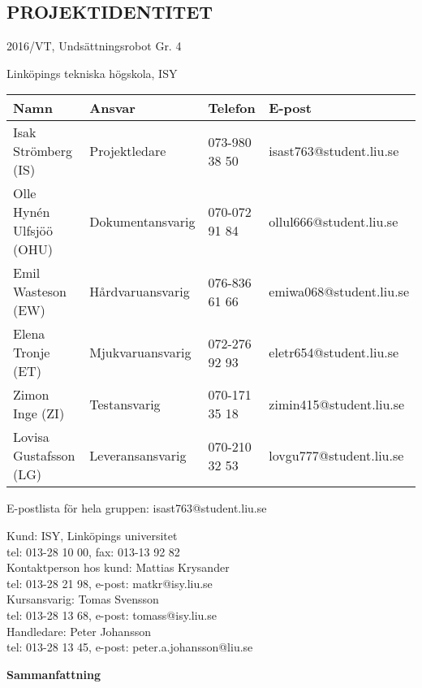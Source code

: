 \documentclass[11pt]{article}
\begin{document}
\pagebreak
\begin{center}

\section*{PROJEKTIDENTITET}
2016/VT, Undsättningsrobot Gr. 4

Linköpings tekniska högskola, ISY
\vspace{5em}
\begin{center}

\begin{tabular}{|l|l|l|l|} \hline
\textbf{Namn} & \textbf{Ansvar} & \textbf{Telefon} & \textbf{E-post}  \\ \hline 
Isak Strömberg (IS) & Projektledare & 073-980 38 50 & isast763@student.liu.se \\ \hline
Olle Hynén Ulfsjöö (OHU)& Dokumentansvarig & 070-072 91 84 & ollul666@student.liu.se \\ \hline
Emil Wasteson (EW) & Hårdvaruansvarig & 076-836 61 66 & emiwa068@student.liu.se \\ \hline
Elena Tronje (ET) & Mjukvaruansvarig & 072-276 92 93 & eletr654@student.liu.se \\ \hline
Zimon Inge (ZI)& Testansvarig & 070-171 35 18 & zimin415@student.liu.se \\ \hline
Lovisa Gustafsson (LG) & Leveransansvarig & 070-210 32 53 & lovgu777@student.liu.se \\ \hline
\end{tabular}

\end{center}

E-postlista för hela gruppen: isast763@student.liu.se

\vspace{5em}
Kund: ISY, Linköpings universitet \\
tel: 013-28 10 00, fax: 013-13 92 82 \\
Kontaktperson hos kund: Mattias Krysander \\
tel: 013-28 21 98, e-post: matkr@isy.liu.se \\

\vspace{5em}
Kursansvarig:  Tomas Svensson\\
tel: 013-28 13 68, e-post: tomass@isy.liu.se \\
Handledare: Peter Johansson \\
tel: 013-28 13 45, e-post: peter.a.johansson@liu.se
\end{center}
\pagebreak
\textbf{Sammanfattning}
\end{document}
